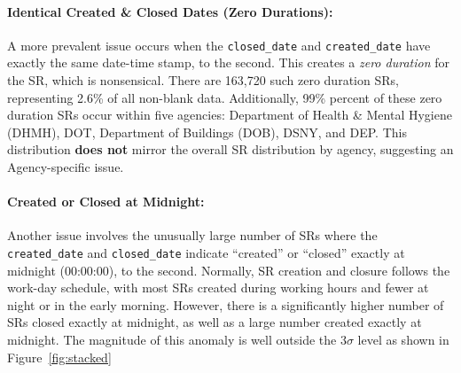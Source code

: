 \documentclass[linenumber]{jdsart}
\begin{document}
\paragraph{Identical Created \& Closed Dates (Zero Durations):}
A more prevalent issue occurs when the \texttt{closed\_date} and 
\texttt{created\_date} have exactly the same date\mbox{-}time stamp, 
to the second. This creates a \emph{zero duration} for the 
SR, which is nonsensical. There are 163,720 such zero duration 
SRs, representing 2.6\% of all non\mbox{-}blank data. 
Additionally, 99\% percent of these zero duration SRs 
occur within five agencies: Department of Health \& Mental 
Hygiene (DHMH), DOT, Department of Buildings (DOB), DSNY, and 
DEP. This distribution \textbf{does not} 
mirror the overall SR distribution by agency, suggesting 
an Agency\mbox{-}specific issue.
	
\paragraph{Created or Closed at Midnight:}
Another issue involves the unusually large number of 
SRs where the \texttt{created\_date} and \texttt{closed\_date} 
indicate ``created'' or ``closed'' exactly at midnight (00:00:00), 
to the second. Normally, SR creation and closure follows 
the work\mbox{-}day schedule, with most SRs created 
during working hours and fewer at night or in the 
early morning. However, there is a significantly higher 
number of SRs closed exactly at midnight, as well 
as a large number created exactly at midnight. The magnitude 
of this anomaly is well outside the 3$\sigma$ level as shown 
in Figure~\ref{fig:stacked}
\end{document}
